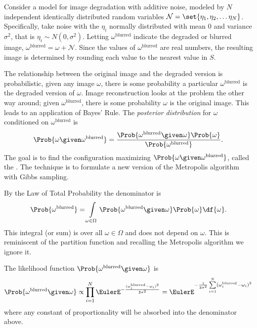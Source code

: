 \documentclass[12pt]{article}
\begin{document}
Consider a model for image degradation with additive noise, modeled by \(
N \) independent identically distributed random variables \(
\mathcal{N} = \set{\eta_1, \eta_2, \dots \eta_N} \).  Specifically, take
noise with the \( \eta_i \) normally distributed with mean \( 0 \) and
variance \( \sigma^2 \), that is \( \eta_i \sim N(0, \sigma^2) \).
Letting \( \omega^{\text{blurred}} \) indicate the degraded or blurred
image, \( \omega^{\text{blurred}} = \omega + \mathcal{N} \).  Since the
values of \( \omega^{\text{blurred}} \) are real numbers, the resulting
image is determined by rounding each value to the nearest value in \( S \).

The relationship between the original image and the degraded version is
probabilistic, given any image \( \omega \), there is some probability a
particular \( \omega^{\text{blurred}} \) is the degraded version of \(
\omega \).  Image reconstruction looks at the problem the other way
around; given \( \omega^{\text{blurred}} \), there is some probability \(
\omega \) is the original image.  This leads to an application of Bayes'
Rule.  The \emph{posterior distribution}%
for \( \omega \) conditioned on \( \omega^{\text{blurred}} \) is
\[
    \Prob{\omega \given \omega^{\text{blurred}}} = \frac{\Prob{\omega^{\text
    {blurred}} \given \omega} \Prob{\omega}} {\Prob{\omega^{\text{blurred}}}}.
\] The goal is to find the configuration maximizing \( \Prob{\omega
\given \omega^{\text{blurred}}} \), called the .%
The technique is to formulate a new version of the Metropolis algorithm
with Gibbs sampling.

By the Law of Total Probability the denominator is
\[
    \Prob{ \omega^{\text{blurred}}} = \int\limits_{\omega \in \Omega}
    \Prob{\omega^{\text{blurred}} \given \omega} \Prob{\omega} \df{\omega}.
\] This integral (or sum) is over all \( \omega \in \Omega \) and does
not depend on \( \omega \).  This is reminiscent of the partition
function and recalling the Metropolis algorithm we ignore it.

The likelihood function \( \Prob{\omega^{\text{blurred}} \given \omega} \)
is%
\[
    \Prob{\omega^{\text{blurred}} \given \omega} \propto \prod_{i=1}^N
    \EulerE^{-\frac{ (\omega_i^{\text{blurred}} - \omega_i)^2}{2 \sigma^2}}
    = \EulerE^{ -\frac{1}{2\sigma^2} \sum\limits_{i=1}^N (\omega_i^{\text
    {blurred}} - \omega_i)^2}
\] where any constant of proportionality will be absorbed into the
denominator above.
\end{document}
